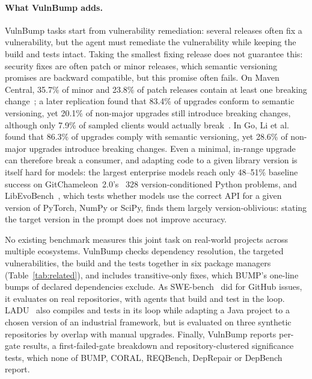 \documentclass[11pt]{article}
\theoremstyle{definition}
\newcommand{\bench}{VulnBump}
\begin{document}
\paragraph{What \bench{} adds.}
\bench{} tasks start from vulnerability remediation: several releases often fix a vulnerability, but the agent must remediate the vulnerability while keeping the build and tests intact. Taking the smallest fixing release does not guarantee this: security fixes are often patch or minor releases, which semantic versioning promises are backward compatible, but this promise often fails. On Maven Central, 35.7\% of minor and 23.8\% of patch releases contain at least one breaking change~\cite{raemaekers2017semver}; a later replication found that 83.4\% of upgrades conform to semantic versioning, yet 20.1\% of non-major upgrades still introduce breaking changes, although only 7.9\% of sampled clients would actually break~\cite{ochoa2022breakingbad}. In Go, Li et al.~\cite{li2023gosvi} found that 86.3\% of upgrades comply with semantic versioning, yet 28.6\% of non-major upgrades introduce breaking changes. Even a minimal, in-range upgrade can therefore break a consumer, and adapting code to a given library version is itself hard for models: the largest enterprise models reach only 48--51\% baseline success on GitChameleon~2.0's~\cite{misra2026gitchameleon} 328 version-conditioned Python problems, and LibEvoBench~\cite{cipollone2026libevobench}, which tests whether models use the correct API for a given version of PyTorch, NumPy or SciPy, finds them largely version-oblivious: stating the target version in the prompt does not improve accuracy.

No existing benchmark measures this joint task on real-world projects across multiple ecosystems. \bench{} checks dependency resolution, the targeted vulnerabilities, the build and the tests together in six package managers (Table~\ref{tab:related}), and includes transitive-only fixes, which BUMP's one-line bumps of declared dependencies exclude. As SWE-bench~\cite{jimenez2024swebench} did for GitHub issues, it evaluates on real repositories, with agents that build and test in the loop. LADU~\cite{tawosi2025ladu} also compiles and tests in its loop while adapting a Java project to a chosen version of an industrial framework, but is evaluated on three synthetic repositories by overlap with manual upgrades. Finally, \bench{} reports per-gate results, a first-failed-gate breakdown and repository-clustered significance tests, which none of BUMP, CORAL, REQBench, DepRepair or DepBench report.
\end{document}
